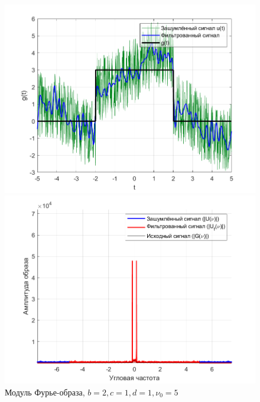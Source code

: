 \documentclass[a4paper]{article}
\begin{document}
\begin{figure}[H]
    \begin{minipage}{0.5\textwidth}
        \centering
        \includegraphics[width=\textwidth]{part2/2_1_1.png}
        \caption{$b = 2, c = 1, d = 1, \nu_0 = 5$}
    \end{minipage}    
    \begin{minipage}{0.5\textwidth}
        \centering
        \includegraphics[width=\textwidth]{part2/2_1_1_Fourier.png}
        \caption{Модуль Фурье-образа, $b = 2, c = 1, d = 1, \nu_0 = 5$}
    \end{minipage}
\end{figure}\
\end{document}
